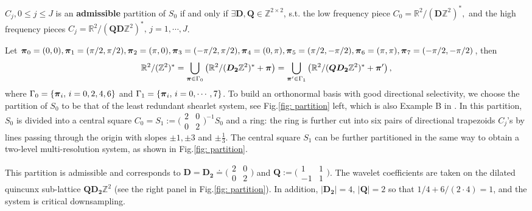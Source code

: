 \begin{mydef}
$C_j, 0\leq j\leq J$ is an {\bf admissible} partition of $S_0$ if and only if $\exists \mathbf{D}, \mathbf{Q}\in\mathbb{Z}^{2\times 2}$, s.t. the low frequency piece $C_0 = \mathbb{R}^2/(\mathbf{D}\mathbb{Z}^2)^*,$ and the high frequency pieces $C_j = \mathbb{R}^2/(\mathbf{QD}\mathbb{Z}^2)^*,\,j = 1,\cdots,J$.
\end{mydef}
Let {\small $\boldsymbol{\pi}_0 = (0,0), \boldsymbol{\pi}_1 = (\pi/2,\pi/2), \boldsymbol{\pi}_2 = (\pi,0),\boldsymbol{\pi}_3 = (-\pi/2,\pi/2), \boldsymbol{\pi}_4 = (0,\pi), \boldsymbol{\pi}_5 = (\pi/2,-\pi/2),\boldsymbol{\pi}_6 = (\pi,\pi), \boldsymbol{\pi}_7=(-\pi/2,-\pi/2)$}, then 
\begin{align*}
\mathbb{R}^2/(\mathbb{Z}^2)^*=\bigcup_{\boldsymbol{\pi}\in\Gamma_0}\left(\mathbb{R}^2/(\boldsymbol{D_2}\mathbb{Z}^2)^* + \boldsymbol{\pi}\right)
=\bigcup_{\boldsymbol{\pi}'\in\Gamma_1}\left(\mathbb{R}^2/(\boldsymbol{QD_2}\mathbb{Z}^2)^* + \boldsymbol{\pi}'\right),
\end{align*}
where
$\Gamma_0= \{\boldsymbol{\pi}_i,\, i = 0,2,4,6\}$ and 
$\Gamma_1 = \{\boldsymbol{\pi}_i,\, i = 0,\cdots,7\}$.
To build an orthonormal basis with good directional selectivity, we choose the partition of $S_0$ to be that of the least redundant shearlet system, see Fig.\ref{fig: partition} left, which is also Example B in \cite{durand2007}. In this partition, $S_0$ is divided into a central square $C_0 = S_1 := \bigl(\begin{smallmatrix} 2&0\\0&2\end{smallmatrix}\bigr)^{-1}S_0$ and a ring: the ring is further cut into six pairs of directional trapezoids $C_j$'s by lines passing through the origin with slopes $\pm 1, \pm 3$ and $\pm \frac{1}{3}$. The central square $S_1$ can be further partitioned in the same way to obtain a two-level multi-resolution system, as shown in Fig.\ref{fig: partition}. 

This partition is admissible and corresponds to $\mathbf{D} = \mathbf{D_2}\doteq\bigl(\begin{smallmatrix} 2&0\\0&2\end{smallmatrix}\bigr)$ and $\mathbf{Q}:=\bigl(\begin{smallmatrix} 1&1\\-1&1\end{smallmatrix}\bigr)$. The wavelet coefficients are taken on the dilated quincunx sub-lattice $\mathbf{QD_2}\mathbb{Z}^2$ (see the right panel in Fig.\ref{fig: partition}).
In addition, $|\mathbf{D_2}| = 4,\,|\mathbf{Q}| = 2$ so that $1/4 + 6/ (2\cdot 4) = 1$, and the system is critical downsampling.